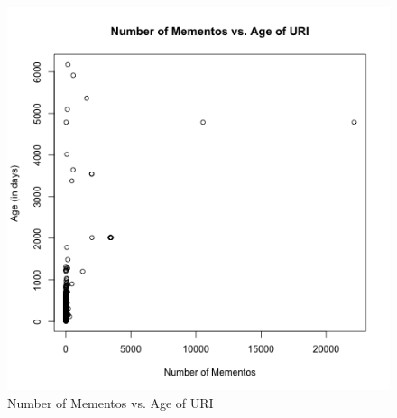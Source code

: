 \documentclass[letterpaper,11pt]{article}
\begin{document}
\begin{figure}
\includegraphics[scale=0.7]{work/q3/q3-scatterplot.png}
\caption{Number of Mementos vs. Age of URI}
\label{fig:q3scatter}
\end{figure}

\newpage

\end{document}
